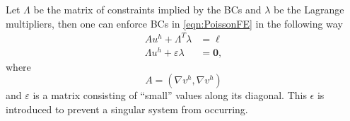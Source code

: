 Let $\Lambda$ be the matrix of constraints implied by the BCs and $\lambda$ be
the Lagrange multipliers, then one can enforce BCs in \eqref{eqn:PoissonFE} in
the following way
\begin{equation}
  \begin{split}
    A u^h + \Lambda^T \lambda &= \ell \\
    \Lambda u^h + \varepsilon \lambda &= \mathbf{0},
  \end{split}
  \label{eqn:Lagrange}
\end{equation}
where
\begin{equation*}
  A = (\nabla v^h, \nabla v^h)
\end{equation*}
and $\varepsilon$ is a matrix consisting of ``small'' values along its
diagonal. This $\epsilon$ is introduced to prevent a singular system from
occurring.


